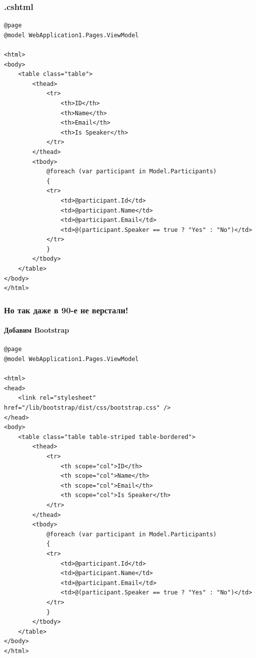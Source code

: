 \documentclass[xetex,mathserif,serif]{beamer}
\begin{document}
	\begin{frame}[fragile]
		\frametitle{.cshtml}
		\begin{scriptsize}
			\begin{verbatim}
@page
@model WebApplication1.Pages.ViewModel

<html>
<body>
    <table class="table">
        <thead>
            <tr>
                <th>ID</th>
                <th>Name</th>
                <th>Email</th>
                <th>Is Speaker</th>
            </tr>
        </thead>
        <tbody>
            @foreach (var participant in Model.Participants)
            {
            <tr>
                <td>@participant.Id</td>
                <td>@participant.Name</td>
                <td>@participant.Email</td>
                <td>@(participant.Speaker == true ? "Yes" : "No")</td>
            </tr>
            }
        </tbody>
    </table>
</body>
</html>
			\end{verbatim}
		\end{scriptsize}
	\end{frame}

	\begin{frame}[fragile]
		\frametitle{Но так даже в 90-е не верстали!}
		\framesubtitle{Добавим Bootstrap}
		\begin{tiny}
			\begin{verbatim}
@page
@model WebApplication1.Pages.ViewModel

<html>
<head>
    <link rel="stylesheet" href="/lib/bootstrap/dist/css/bootstrap.css" />
</head>
<body>
    <table class="table table-striped table-bordered">
        <thead>
            <tr>
                <th scope="col">ID</th>
                <th scope="col">Name</th>
                <th scope="col">Email</th>
                <th scope="col">Is Speaker</th>
            </tr>
        </thead>
        <tbody>
            @foreach (var participant in Model.Participants)
            {
            <tr>
                <td>@participant.Id</td>
                <td>@participant.Name</td>
                <td>@participant.Email</td>
                <td>@(participant.Speaker == true ? "Yes" : "No")</td>
            </tr>
            }
        </tbody>
    </table>
</body>
</html>
			\end{verbatim}
		\end{tiny}
	\end{frame}
\end{document}
